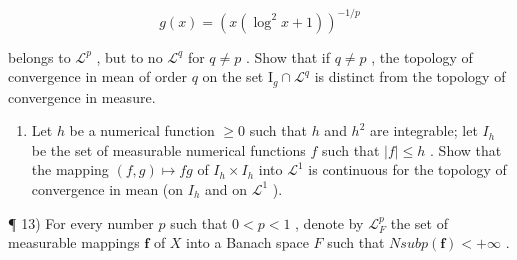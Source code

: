 \[
g (x) = \left(x (\log^ {2} x + 1)\right) ^ {- 1 / p}
\]

belongs to \(\mathcal{L}^p\) , but to no \(\mathcal{L}^q\) for \(q \neq p\) . Show that if \(q \neq p\) , the topology of convergence in mean of order \(q\) on the set \(\mathrm{I}_g \cap \mathcal{L}^q\) is distinct from the topology of convergence in measure.

\begin{enumerate}
\def\labelenumi{\arabic{enumi})}
\setcounter{enumi}{11}
\tightlist
\item
  Let \(h\) be a numerical function \(\geqslant 0\) such that \(h\) and \(h^2\) are integrable; let \(I_h\) be the set of measurable numerical functions \(f\) such that \(|f| \leqslant h\) . Show that the mapping \((f, g) \mapsto fg\) of \(I_h \times I_h\) into \(\mathcal{L}^1\) is continuous for the topology of convergence in mean (on \(I_h\) and on \(\mathcal{L}^1\) ).
\end{enumerate}

¶ 13) For every number \(p\) such that \(0 < p < 1\) , denote by \(\mathcal{L}_F^p\) the set of measurable mappings \(\mathbf{f}\) of \(X\) into a Banach space \(F\) such that \(N sub p(\mathbf{f}) < +\infty\) .

